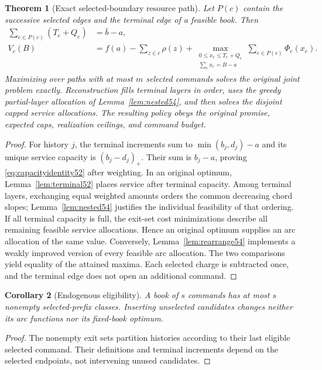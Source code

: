 \documentclass[11pt,letterpaper]{article}
\newtheorem{theorem}{Theorem}[section]
\newtheorem{corollary}[theorem]{Corollary}
\theoremstyle{definition}\newtheorem{remark}[theorem]{Remark}
\begin{document}
\begin{theorem}[Exact selected-boundary resource path]\label{thm:path52}
Let $P(c)$ contain the successive selected edges and the terminal edge of a feasible book. Then
\begin{align}
 \sum_{e\in P(c)}(T_e+Q_e)&=\bar b-a,\label{eq:capacityidentity52}\\
 V_c(B)&=f(a)-\sum_{z\in c}\rho(z)+
 \max_{\substack{0\leq x_e\leq T_e+Q_e\\\sum_e x_e=B-a}}\sum_{e\in P(c)}\Phi_e(x_e).\label{eq:pathidentity52}
\end{align}
Maximizing over paths with at most $m$ selected commands solves the original joint problem exactly. Reconstruction fills terminal layers in order, uses the greedy partial-layer allocation of Lemma~\ref{lem:nested54}, and then solves the disjoint capped service allocations. The resulting policy obeys the original promise, expected caps, realization ceilings, and command budget.
\end{theorem}
\begin{proof}
For history $j$, the terminal increments sum to $\min(b_j,d_j)-a$ and its unique service capacity is $(b_j-d_j)_+$. Their sum is $b_j-a$, proving \eqref{eq:capacityidentity52} after weighting. In an original optimum, Lemma~\ref{lem:terminal52} places service after terminal capacity. Among terminal layers, exchanging equal weighted amounts orders the common decreasing chord slopes; Lemma~\ref{lem:nested54} justifies the individual feasibility of that ordering. If all terminal capacity is full, the exit-set cost minimizations describe all remaining feasible service allocations. Hence an original optimum supplies an arc allocation of the same value. Conversely, Lemma~\ref{lem:rearrange54} implements a weakly improved version of every feasible arc allocation. The two comparisons yield equality of the attained maxima. Each selected charge is subtracted once, and the terminal edge does not open an additional command.
\end{proof}

\begin{corollary}[Endogenous eligibility]\label{cor:endogenous52}
A book of $s$ commands has at most $s$ nonempty selected-prefix classes. Inserting unselected candidates changes neither its arc functions nor its fixed-book optimum.
\end{corollary}
\begin{proof}
The nonempty exit sets partition histories according to their last eligible selected command. Their definitions and terminal increments depend on the selected endpoints, not intervening unused candidates.
\end{proof}
\end{document}
